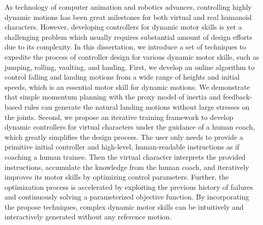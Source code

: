 \begin{summary}

As technology of computer animation and robotics advances,
controlling highly dynamic motions
has been great milestones for both virtual and real humanoid characters.
However, developing controllers for dynamic motor skills is yet a challenging
problem which usually requires substantial amount of design efforts
due to its complexity.
In this dissertation, we introduce a set of techniques to expedite the
process of controller design for various dynamic motor skills,
such as jumping, rolling, vaulting, and landing.
First, we develop an online algorithm to control falling and landing motions 
from a wide range of heights and initial speeds,
which is an essential motor skill for dynamic motions. 
We demonstrate that simple momentum planning with the proxy model of inertia 
and feedback-based rules can generate the natural landing motions
without large stresses on the joints.
Second, we propose an iterative training framework to develop dynamic 
controllers for virtual characters under the guidance of a human coach,
which greatly simplifies the design process.
The user only needs to provide a primitive initial controller and high-level, 
human-readable instructions as if coaching a human trainee.
Then the virtual character interprets the provided instructions,
accumulate the knowledge from the human coach,
and iteratively improves its motor skills by optimizing control parameters.
Further, the optimization process is accelerated by 
exploiting the previous history of failures and 
continuously solving a parameterized objective function.
By incorporating the propose techniques, complex dynamic motor skills
can be intuitively and interactively generated without any reference motion.




\end{summary}
